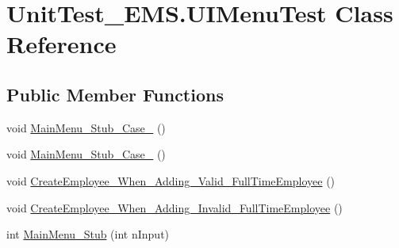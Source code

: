 \hypertarget{class_unit_test___e_m_s_1_1_u_i_menu_test}{\section{Unit\-Test\-\_\-\-E\-M\-S.\-U\-I\-Menu\-Test Class Reference}
\label{class_unit_test___e_m_s_1_1_u_i_menu_test}
}
\subsection*{Public Member Functions}
\begin{DoxyCompactItemize}
\item 
void \hyperlink{class_unit_test___e_m_s_1_1_u_i_menu_test_af29f07a03dfcfd55938532fcba02eb1b}{Main\-Menu\-\_\-\-Stub\-\_\-\-Case\-\_} ()
\item 
void \hyperlink{class_unit_test___e_m_s_1_1_u_i_menu_test_a530ba3af8b5228ba8533900c2b6d7350}{Main\-Menu\-\_\-\-Stub\-\_\-\-Case\-\_} ()
\item 
void \hyperlink{class_unit_test___e_m_s_1_1_u_i_menu_test_a8d832f12610574b0f52b215aab9fbc94}{Create\-Employee\-\_\-\-When\-\_\-\-Adding\-\_\-\-Valid\-\_\-\-Full\-Time\-Employee} ()
\item 
void \hyperlink{class_unit_test___e_m_s_1_1_u_i_menu_test_a13c744ad18a72f3cc6430626d7ec6355}{Create\-Employee\-\_\-\-When\-\_\-\-Adding\-\_\-\-Invalid\-\_\-\-Full\-Time\-Employee} ()
\item 
int \hyperlink{class_unit_test___e_m_s_1_1_u_i_menu_test_ac50008b6c62ac06882a722142c561700}{Main\-Menu\-\_\-\-Stub} (int n\-Input)
\end{DoxyCompactItemize}


